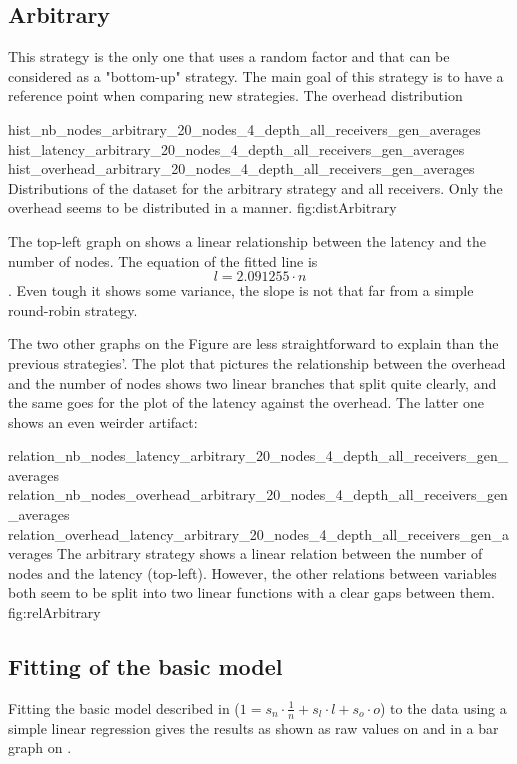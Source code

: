 \FloatBarrier
\subsection{Arbitrary}
\label{ssec:arbitrary}

This strategy is the only one that uses a random factor and that can be
considered as a "bottom-up" strategy. The main goal of this strategy is to
have a reference point when comparing new strategies.
The overhead distribution 

\triplefigure
    {hist_nb_nodes_arbitrary_20_nodes_4_depth_all_receivers_gen_averages}
    {hist_latency_arbitrary_20_nodes_4_depth_all_receivers_gen_averages}
    {hist_overhead_arbitrary_20_nodes_4_depth_all_receivers_gen_averages}
    {Distributions of the dataset for the arbitrary strategy and all
    receivers. Only the overhead seems to be distributed in a  manner. }
    {fig:distArbitrary}

The top-left graph on  shows a linear relationship
between the latency and the number of nodes. The equation of the fitted line is
\[l = 2.091255 \cdot n\]. Even tough it shows some variance, the slope is
not that far from a simple round-robin strategy. 

The two other graphs on the Figure are less straightforward to explain than the
previous strategies'. The plot that pictures the relationship between the
overhead and the number of nodes shows two linear branches that split quite
clearly, and the same goes for the plot of the latency against the overhead.
The latter one shows an even weirder artifact: 

\triplefigure
    {relation_nb_nodes_latency_arbitrary_20_nodes_4_depth_all_receivers_gen_averages}
    {relation_nb_nodes_overhead_arbitrary_20_nodes_4_depth_all_receivers_gen_averages}
    {relation_overhead_latency_arbitrary_20_nodes_4_depth_all_receivers_gen_averages}
    {The arbitrary strategy shows a linear relation between the number of
    nodes and the latency (top-left). However, the other relations between
    variables both seem to be split into two linear functions with a clear gaps
    between them.}
    {fig:relArbitrary}

\FloatBarrier
\subsection{Fitting of the basic model}
Fitting the basic model described in  (\(1 = s_n
\cdot \frac{1}{n} + s_l\cdot l + s_o\cdot o\)) to the data using a simple linear
regression gives the results as shown as raw values on
 and in a bar graph on
.

